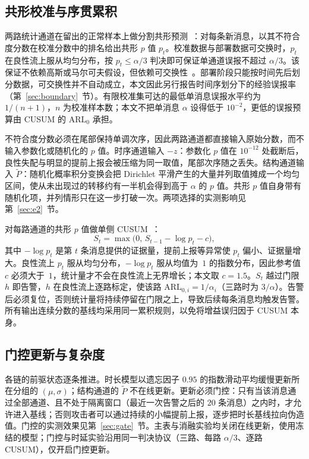\documentclass[manuscript,screen,review]{acmart}
\begin{document}
\subsection{共形校准与序贯累积}
\label{sec:conformal}

两路统计通道在留出的正常样本上做分割共形预测~\cite{shafer2008conformal,angelopoulos2023conformal}：对每条新消息，以其不符合度分数在校准分数中的排名给出共形 $p$ 值 $p_t$。校准数据与部署数据可交换时，$p_t$ 在良性流上服从均匀分布，按 $p_t\le\alpha/3$ 判决即可保证单通道误报不超过 $\alpha/3$。该保证不依赖高斯或马尔可夫假设，但依赖可交换性~\cite{barber2023exchangeability}。部署阶段只能按时间先后划分数据，可交换性并不自动成立，本文因此另行报告时间序划分下的经验误报率（第~\ref{sec:boundary}~节）。有限校准集可达的最低单消息误报水平约为 $1/(n+1)$，$n$ 为校准样本数；本文不把单消息 $\alpha$ 设得低于 $10^{-2}$，更低的误报预算由 {CUSUM} 的 $\mathrm{ARL}_0$ 承担。

不符合度分数必须在尾部保持单调次序，因此两路通道都直接输入原始分数，而不输入参数化或随机化的 $p$ 值。时序通道输入 $-z$：参数化 $p$ 值在 $10^{-12}$ 处截断后，良性失配与明显的提前上报会被压缩为同一取值，尾部次序随之丢失。结构通道输入 $\tilde P$：随机化概率积分变换会把 {Dirichlet} 平滑产生的大量并列取值摊成一个均匀区间，使从未出现过的转移约有一半机会得到高于 $\alpha$ 的 $p$ 值。共形 $p$ 值自身带有随机化项，并列情形只在这一步打破一次。两项选择的实测影响见第~\ref{sec:e2}~节。

对每路通道的共形 $p$ 值做单侧 {CUSUM}~\cite{li2015quickest}：
\begin{equation}
  S_t=\max\bigl(0,\,S_{t-1}-\log p_t-c\bigr),
  \label{eq:cusum}
\end{equation}
其中 $-\log p_t$ 是第 $t$ 条消息提供的证据量，提前上报等异常使 $p_t$ 偏小、证据量增大。良性流上 $p_t$ 服从均匀分布，$-\log p_t$ 服从均值为~$1$ 的指数分布，因此参考值 $c$ 必须大于~$1$，统计量才不会在良性流上无界增长；本文取 $c=1.5$。$S_t$ 越过门限 $h$ 即告警，$h$ 在良性流上逐路标定，使该路 $\mathrm{ARL}_{0,i}=1/\alpha_i$（三路时为 $3/\alpha$）。告警后必须复位，否则统计量将持续停留在门限之上，导致后续每条消息均触发告警。所有输出连续分数的基线均采用同一累积规则，以免将增益误归因于 {CUSUM} 本身。

\subsection{门控更新与复杂度}
\label{sec:online}

各链的前驱状态逐条推进。时长模型以遗忘因子 $0.95$ 的指数滑动平均缓慢更新所在分组的 $(\mu,\sigma)$；结构通道的 $\tilde P$ 不在线更新。更新必须门控：只有当该消息通过全部通道、且不处于隔离窗口（最近一次告警之后的 $20$ 条消息）之内时，才允许进入基线；否则攻击者可以通过持续的小幅提前上报，逐步把时长基线拉向伪造值。门控的实测效果见第~\ref{sec:gate}~节。主表与消融实验均关闭在线更新，使用冻结的模型；门控与时延实验沿用同一判决协议（三路、每路 $\alpha/3$、逐路 {CUSUM}），仅开启门控更新。
\end{document}
